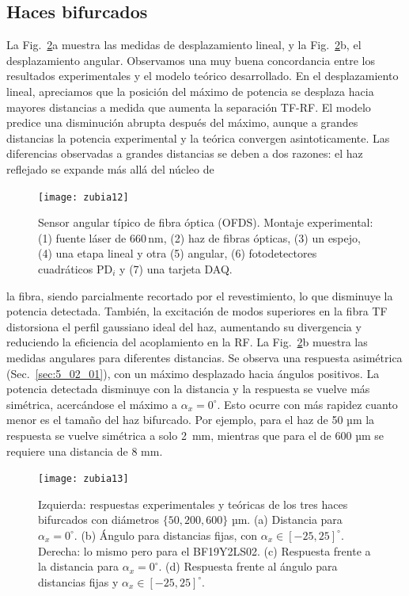\documentclass[11pt,a4paper]{article}
\begin{document}
\begin{multicols}{2}
\subsection{Haces bifurcados}
La Fig.~\ref{fig:5_13}a muestra las medidas de desplazamiento lineal, y la Fig.~\ref{fig:5_13}b, el desplazamiento angular. Observamos una muy buena concordancia entre los resultados experimentales y el modelo teórico desarrollado. En el desplazamiento lineal, apreciamos que la posición del máximo de potencia se desplaza hacia mayores distancias a medida que aumenta la separación TF-RF. El modelo predice una disminución abrupta después del máximo, aunque a grandes distancias la potencia experimental y la teórica convergen asintoticamente. Las diferencias observadas a grandes distancias se deben a dos razones: el haz reflejado se expande más allá del núcleo de
\begin{figure}[H]
    \centering
    \texttt{[image: zubia12]}
    \caption{Sensor angular típico de fibra óptica (OFDS).  Montaje experimental: (1) fuente láser de 660\,nm, (2) haz de fibras ópticas, (3) un espejo, (4) una etapa lineal y otra (5) angular, (6) fotodetectores cuadráticos $\text{PD}_i$ y (7) una tarjeta DAQ.}
    \label{fig:5_12}
\end{figure}
\unskip
la fibra, siendo parcialmente recortado por el revestimiento, lo que disminuye la potencia detectada.
También, la excitación de modos superiores en la fibra TF distorsiona el perfil gaussiano ideal del haz, aumentando su divergencia y reduciendo la eficiencia del acoplamiento en la RF. La Fig.~\ref{fig:5_13}b muestra las medidas angulares para diferentes distancias. Se observa una respuesta asimétrica (Sec.~\ref{sec:5_02_01}), con un máximo desplazado hacia ángulos positivos. La potencia detectada disminuye con la distancia y la respuesta se vuelve más simétrica, acercándose el máximo a $\alpha_x = 0^\circ$. Esto ocurre con más rapidez cuanto menor es el tamaño del haz bifurcado. Por ejemplo, para el haz de 50 µm la respuesta se vuelve simétrica a solo 2~mm, mientras que para el de 600 µm se requiere una distancia de 8 mm.
\begin{figure}[t]
    \centering
    \texttt{[image: zubia13]}
    \caption{Izquierda: respuestas experimentales y teóricas de los tres haces bifurcados con diámetros $\{50,200,600\}$ µm. (a) Distancia para $\alpha_x = 0^\circ$. (b) Ángulo para distancias fijas, con $\alpha_x \in [-25, 25]^\circ$. Derecha: lo mismo pero para el BF19Y2LS02. (c) Respuesta frente a la distancia para $\alpha_x = 0^\circ$. (d) Respuesta frente al ángulo para distancias fijas y $\alpha_x \in [-25,25]^\circ$.}
    \label{fig:5_13}
\end{figure}
\unskip

\end{multicols}
\end{document}
